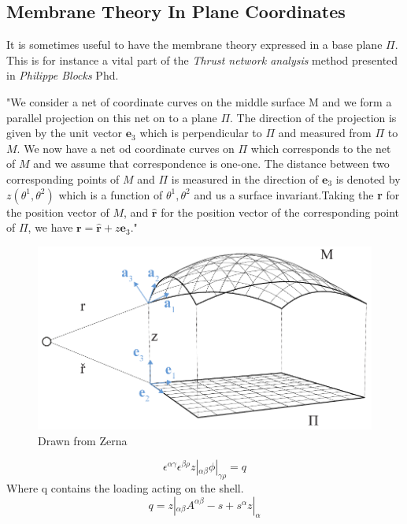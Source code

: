 \subsection{Membrane Theory In Plane Coordinates}
It is sometimes useful to have the membrane theory expressed in a base plane $\Pi$. This is for instance a vital part of the \textit{Thrust network analysis} method presented in \textit{Philippe Blocks} Phd.

"We consider a net of coordinate curves on the middle surface M and we form a parallel projection on this net on to a plane $\Pi$. The direction of the projection is given by the unit vector $\textbf{e}_3$ which is perpendicular to $\Pi$ and measured from $\Pi$ to $M$. We now have a net od coordinate curves on $\Pi$ which corresponds to the net of $M$ and we assume that correspondence is one-one. The distance between two corresponding points of  $M$ and $\Pi$ is measured in the direction of $\textbf{e}_3$ is denoted by $z(\theta^1, \theta^2)$ which is a function of $\theta^1,\theta^2$ and us a surface invariant.Taking the \textbf{r} for the position vector of $M$, and $\hat{\textbf{r}}$ for the position vector of the corresponding point of $\Pi$, we have $\textbf{r} = \hat{\textbf{r}} + z \textbf{e}_3$."

\begin{figure}[H]
\centering
\includegraphics[width=0.9\linewidth ]{figure/Theory/planeShell.pdf}
\caption{Drawn from Zerna }
\end{figure}


\begin{equation}\label{memEq}
\epsilon^{\alpha \gamma}\epsilon^{\beta \rho} z|_{\alpha \beta}\phi|_{\gamma \rho} = q
\end{equation}
Where q contains the loading acting on the shell. 
\begin{equation}
q = z|_{\alpha \beta}A^{\alpha \beta} - s + s^\alpha z |_\alpha
\end{equation}

